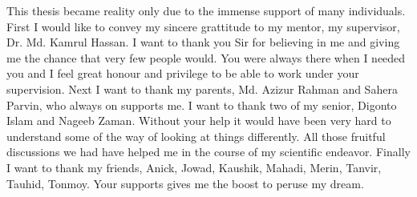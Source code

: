 
\begin{acknowledgements}      
	This thesis became reality only due to the immense support of many individuals. First I would like to convey my sincere grattitude to my mentor, my supervisor, Dr. Md. Kamrul Hassan. I want to thank you Sir for believing in me and giving me the chance that very few people would. You were always there when I needed you and I feel great honour and privilege to be able to work under your supervision. Next I want to thank my parents, Md. Azizur Rahman and Sahera Parvin, who always on supports me. I want to thank two of my senior, Digonto Islam and Nageeb Zaman. Without your help it would have been very hard to understand some of the way of looking at things differently. All those fruitful discussions we had have helped me in the course of my scientific endeavor. Finally I want to thank my friends, Anick, Jowad, Kaushik, Mahadi, Merin, Tanvir, Tauhid, Tonmoy. Your supports gives me the boost to peruse my dream.
\end{acknowledgements}
